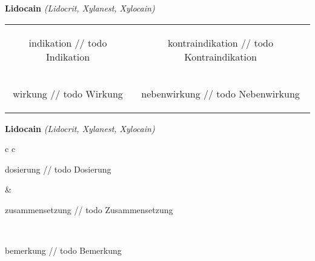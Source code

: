 \documentclass[12pt]{beamer}
\begin{document}
\begin{frame}{
    \textbf{Lidocain}
    \textit{(Lidocrit, Xylanest, Xylocain)}
}
    \begin{tabular}{c c}
        \begin{beamercolorbox}[wd=\boxwidth\textwidth,ht=\boxheight\textheight,sep=1em]{indikation}
        // todo Indikation
        \end{beamercolorbox} & 
        \begin{beamercolorbox}[wd=\boxwidth\textwidth,ht=\boxheight\textheight,sep=1em]{kontraindikation}
        // todo Kontraindikation 
        \end{beamercolorbox} \\
        \begin{beamercolorbox}[wd=\boxwidth\textwidth,ht=\boxheight\textheight,sep=1em]{wirkung}
        // todo Wirkung
        \end{beamercolorbox} & 
        \begin{beamercolorbox}[wd=\boxwidth\textwidth,ht=\boxheight\textheight,sep=1em]{nebenwirkung}
        // todo Nebenwirkung
        \end{beamercolorbox} \\
    \end{tabular}
\end{frame}

\begin{frame}{
    \textbf{Lidocain}
    \textit{(Lidocrit, Xylanest, Xylocain)}
}
    \begin{tabular}{c c}
        \begin{beamercolorbox}[wd=\boxwidth\textwidth,ht=\boxheight\textheight,sep=1em]{dosierung}
        // todo Dosierung
        \end{beamercolorbox} & 
        \begin{beamercolorbox}[wd=\boxwidth\textwidth,ht=\boxheight\textheight,sep=1em]{zusammensetzung}
        // todo Zusammensetzung
        \end{beamercolorbox} \\
        \begin{beamercolorbox}[wd=\textwidth,ht=\boxheight\textheight,sep=1em]{bemerkung}
        // todo Bemerkung
        \end{beamercolorbox} \\
    \end{tabular}
\end{frame}
\end{document}
